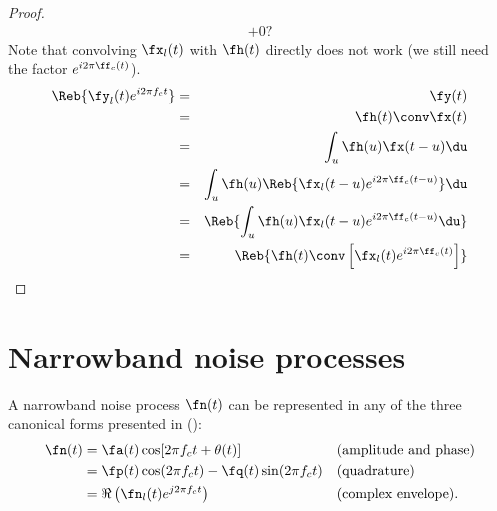 \begin{proof}
\begin{eqnarray*}
        + 0 ?
\end{eqnarray*}
\attention
Note that convolving $\fx_l(t)$ with $\fh(t)$ directly does
not work (we still need the factor $e^{i2\pi \ff_c(t)}$).
\begin{eqnarray*}
   \Reb{ \fy_l(t)e^{i2\pi f_ct}}
     &=& \fy(t)
   \\&=& \fh(t) \conv \fx(t)
   \\&=& \int_u \fh(u)\fx(t-u)\du
   \\&=& \int_u \fh(u)
                \Reb{ \fx_l(t-u)e^{i2\pi \ff_c(t-u)}} \du
   \\&=& \Reb{ \int_u \fh(u)
                \fx_l(t-u)e^{i2\pi \ff_c(t-u)} \du }
   \\&=& \Reb{ \fh(t)\conv\left[\fx_l(t)e^{i2\pi \ff_c(t)}\right]}
\end{eqnarray*}
\end{proof}



\section{Narrowband noise processes}
A narrowband noise process $\fn(t)$ can be represented in any of the
three canonical forms presented in 
():
\begin{align*}
   \fn(t)
     &= \fa(t)\cos[2\pi f_ct + \theta(t)]              
     && \text{(amplitude and phase)}
   \\&= \fp(t)\cos(2\pi f_ct) - \fq(t) \sin(2\pi f_c t)  
     && \text{(quadrature)}
   \\&= \Re\left(\fn_l(t)e^{j2\pi f_ct}\right)                 
     && \text{(complex envelope).}
\end{align*}



